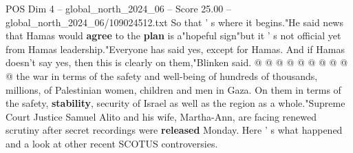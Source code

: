 \begin{textsample}{POS Dim 4 – global\_north\_2024\_06 – Score 25.00 – global\_north\_2024\_06/109024512.txt}
So that ' s where it begins."He said news that Hamas would \textbf{agree} to the \textbf{plan} is a"hopeful sign"but it ' s not official yet from Hamas leadership."Everyone has said yes, except for Hamas.
And if Hamas doesn't say yes, then this is clearly on them,"Blinken said. @ @ @ @ @ @ @ @ @ @ the war in terms of the safety and well-being of hundreds of thousands, millions, of Palestinian women, children and men in Gaza.
On them in terms of the safety, \textbf{stability}, security of Israel as well as the region as a whole."Supreme Court Justice Samuel Alito and his wife, Martha-Ann, are facing renewed scrutiny after secret recordings were \textbf{released} Monday.
Here ' s what happened and a look at other recent SCOTUS controversies.

\end{textsample}
